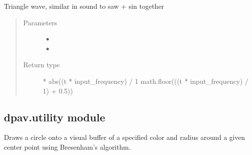 \documentclass[letterpaper,10pt,english]{sphinxmanual}
\begin{document}
\begin{fulllineitems}
\begin{fulllineitems}
\label{\detokenize{dpav:dpav.audio.wave_table.triangle}}
\pysigstartsignatures
{}
\pysigstopsignatures
\sphinxAtStartPar
Triangle wave, similar in sound to saw + sin together
\begin{quote}\begin{description}
\item[{Parameters}] \leavevmode\begin{itemize}
\item {} 
\sphinxAtStartPar
{} \textendash{} 

\item {} 
\sphinxAtStartPar
{} \textendash{} 

\end{itemize}

\item[{Return type}] \leavevmode
{} * abs((t * input\_frequency) / 1 \sphinxhyphen{} math.floor(((t * input\_frequency) / 1) + 0.5))

\end{description}\end{quote}

\end{fulllineitems}


\end{fulllineitems}



\subsection{dpav.utility module}
\label{\detokenize{dpav:module-dpav.utility}}\label{\detokenize{dpav:dpav-utility-module}}

\begin{fulllineitems}
\label{\detokenize{dpav:dpav.utility.draw_circle}}
\pysigstartsignatures
{}
\pysigstopsignatures
\sphinxAtStartPar
Draws a circle onto a visual buffer of a specified color and radius
around a given center point using Bresenham’s algorithm.

\end{fulllineitems}
\end{document}
